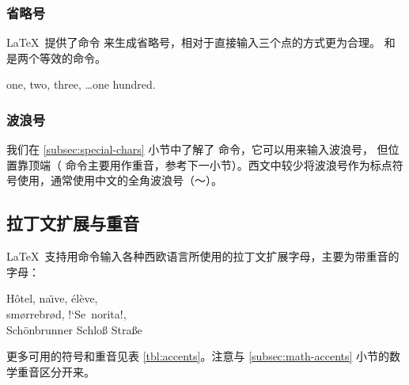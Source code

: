 \subsubsection{省略号}

\LaTeX\ 提供了命令  来生成省略号，相对于直接输入三个点的方式更为合理。
 和  是两个等效的命令。
\begin{example}
one, two, three, \ldots one hundred.
\end{example}

\subsubsection{波浪号}

我们在 \ref{subsec:special-chars} 小节中了解了 \cmd{\textasciitilde} 命令，它可以用来输入波浪号，
但位置靠顶端（\cmd{\textasciitilde} 命令主要用作重音，参考下一小节）。西文中较少将波浪号作为标点符号使用，通常使用中文的全角波浪号（～）。

\subsection{拉丁文扩展与重音}\label{subsec:accents}

\LaTeX\ 支持用命令输入各种西欧语言所使用的拉丁文扩展字母，主要为带重音的字母：
\begin{example}
H\^otel, na\"\i ve, \'el\`eve,\\
sm\o rrebr\o d, !`Se\ norita!,\\
Sch\"onbrunner Schlo\ss{}
Stra\ss e
\end{example}

更多可用的符号和重音见表 \ref{tbl:accents}。注意与 \ref{subsec:math-accents} 小节的数学重音区分开来。

